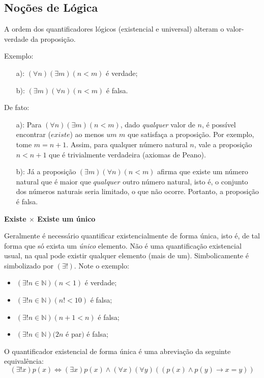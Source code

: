 \documentclass[oneside,a4paper,12pt]{article}
\begin{document}
\subsection{Noções de Lógica}
A ordem dos quantificadores lógicos (existencial e universal) alteram o valor-verdade da proposição.

Exemplo:
\begin{itemize}
	\item [a):] $(\forall n)(\exists m)(n<m)$ é verdade;
	\item [b):] $(\exists m)(\forall n)(n<m)$ é falsa.
\end{itemize}

De fato:
\begin{itemize}
	\item [a):] Para $(\forall n)(\exists m)(n<m)$, dado {\it qualquer} valor de $n$, é possível encontrar ($existe$) ao menos $um$ $m$ que satisfaça a proposição. Por exemplo, tome $m=n+1$. Assim, para qualquer número natural $n$, vale a proposição $n<n+1$ que é trivialmente verdadeira (axiomas de Peano).
	\item [b):] Já a proposição $(\exists m)(\forall n)(n<m)$ afirma que existe um número natural que é maior que $qualquer$ outro número natural, isto é, o conjunto dos números naturais seria limitado, o que não ocorre. Portanto, a proposição é falsa.
\end{itemize}

\textbf{Existe $\times$ Existe um único}

Geralmente é necessário quantificar existencialmente de forma única, isto é, de tal forma que só exista um {\it único} elemento. Não é uma quantificação existencial usual, na qual pode existir qualquer elemento (mais de um). Simbolicamente é simbolizado por $(\exists!)$. Note o exemplo:
\begin{itemize}
	\item $(\exists!n\in \mathbb{N})(n<1)$ é verdade;
	\item $(\exists!n\in \mathbb{N})(n! < 10)$ é falsa;
	\item $(\exists!n\in \mathbb{N})(n+1 < n)$ é falsa;
	\item $(\exists!n\in \mathbb{N})(2n$ é par$)$ é falsa;
\end{itemize}

O quantificador existencial de forma única é uma abreviação da seguinte equivalência:
$$(\exists!x)p(x) \Leftrightarrow (\exists x)p(x) \land (\forall x)(\forall y)((p(x)\land p(y) \rightarrow x=y))$$
\end{document}
